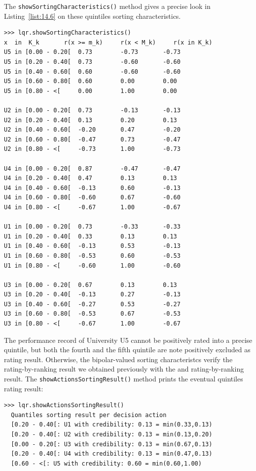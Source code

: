The \texttt{showSortingCharacteristics()} method gives a precise look in Listing~\vref{list:14.6} on these quintiles sorting characteristics.
\begin{lstlisting}[caption={Showing quantiles sorting characteristics},label=list:14.6,basicstyle=\ttfamily\scriptsize]
>>> lqr.showSortingCharacteristics()
x  in  K_k	     r(x >= m_k)     r(x < M_k)	    r(x in K_k)
U5 in [0.00 - 0.20[	 0.73		 -0.73		 -0.73
U5 in [0.20 - 0.40[	 0.73		 -0.60		 -0.60
U5 in [0.40 - 0.60[	 0.60		 -0.60		 -0.60
U5 in [0.60 - 0.80[	 0.60		 0.00		 0.00
U5 in [0.80 - <[	 0.00		 1.00		 0.00

U2 in [0.00 - 0.20[	 0.73		 -0.13		 -0.13
U2 in [0.20 - 0.40[	 0.13		 0.20		 0.13
U2 in [0.40 - 0.60[	 -0.20		 0.47		 -0.20
U2 in [0.60 - 0.80[	 -0.47		 0.73		 -0.47
U2 in [0.80 - <[	 -0.73		 1.00		 -0.73

U4 in [0.00 - 0.20[	 0.87		 -0.47		 -0.47
U4 in [0.20 - 0.40[	 0.47		 0.13		 0.13
U4 in [0.40 - 0.60[	 -0.13		 0.60		 -0.13
U4 in [0.60 - 0.80[	 -0.60		 0.67		 -0.60
U4 in [0.80 - <[	 -0.67		 1.00		 -0.67

U1 in [0.00 - 0.20[	 0.73		 -0.33		 -0.33
U1 in [0.20 - 0.40[	 0.33		 0.13		 0.13
U1 in [0.40 - 0.60[	 -0.13		 0.53		 -0.13
U1 in [0.60 - 0.80[	 -0.53		 0.60		 -0.53
U1 in [0.80 - <[	 -0.60		 1.00		 -0.60

U3 in [0.00 - 0.20[	 0.67		 0.13		 0.13
U3 in [0.20 - 0.40[	 -0.13		 0.27		 -0.13
U3 in [0.40 - 0.60[	 -0.27		 0.53		 -0.27
U3 in [0.60 - 0.80[	 -0.53		 0.67		 -0.53
U3 in [0.80 - <[	 -0.67		 1.00		 -0.67
\end{lstlisting}

The performance record of University U5 cannot be positively rated into a precise quintile, but both the fourth and the fifth quintile are note positively excluded as rating result. Otherwise, the bipolar-valued sorting characteristcs verify the rating-by-ranking result we obtained previously with the \Kemeny and \Copeland rating-by-ranking result. 
The \texttt{showActionsSortingResult()} method prints the eventual quintiles rating result:
\begin{lstlisting}[caption={Showing a quintiles rating-by-sorting result},label=list:14.7]
>>> lqr.showActionsSortingResult()
  Quantiles sorting result per decision action
  [0.20 - 0.40[: U1 with credibility: 0.13 = min(0.33,0.13)
  [0.20 - 0.40[: U2 with credibility: 0.13 = min(0.13,0.20)
  [0.00 - 0.20[: U3 with credibility: 0.13 = min(0.67,0.13)
  [0.20 - 0.40[: U4 with credibility: 0.13 = min(0.47,0.13)
  [0.60 - <[: U5 with credibility: 0.60 = min(0.60,1.00)
\end{lstlisting}

